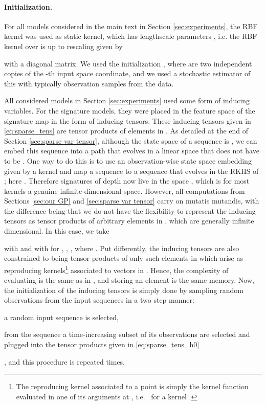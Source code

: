 \documentclass{article}
\begin{document}
\paragraph{Initialization.} For all models considered in the main text in Section \ref{sec:experiments}, the RBF kernel was used as static kernel, which has lengthscale parameters , i.e. the RBF kernel over  is up to rescaling given by

with  a diagonal matrix. We used the initialization , where  are two independent copies of the -th input space coordinate, and we used a stochastic estimator of this with typically  observation samples from the data. 

All considered models in Section \ref{sec:experiments} used some form of inducing variables.
For the signature models, they were placed in the feature space of the signature map in the form of inducing tensors.
These inducing tensors given in \eqref{eq:sparse_tens} are tensor products of elements in .
As detailed at the end of Section \ref{sec:sparse var tensor}, although the state space of a sequence is , we can embed this sequence into a path that evolves in a linear space  that does not have to be .
One way to do this is to use an observation-wise state space embedding given by a kernel  and map a sequence  to a sequence  that evolves in the RKHS  of ; here .
Therefore signatures of depth  now live in the space , which is for most kernels  a genuine infinite-dimensional space.
However, all computations from Sections \ref{sec:our GP} and \ref{sec:sparse var tensor} carry on mutatis mutandis, with the difference being that we do not have the flexibility to represent the inducing tensors as tensor products of arbitrary elements in , which are generally infinite dimensional.
In this case, we take


with  and  with  for , , , where .
Put differently, the inducing tensors are also constrained to being tensor products of only such elements in  which arise as reproducing kernels\footnote{The reproducing kernel associated to a point  is simply the kernel function evaluated in one of its arguments at , i.e.~ for a kernel .}  associated to vectors in .
Hence, the complexity of evaluating  is the same as in , and storing an element  is the same memory.
Now, the initialization of the inducing tensors is simply done by sampling random observations from the input sequences in a two step manner: \begin{enumerate*}[label=(\arabic*)] \item a random input sequence is selected, \item from the sequence a time-increasing subset of its observations are selected and plugged into the tensor products given in \eqref{eq:sparse_tens_h0} \end{enumerate*}, and this procedure is repeated  times.
\end{document}
